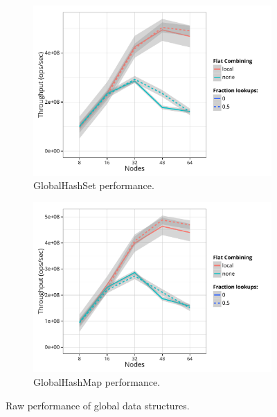 \begin{figure}[t]
  \begin{subfigure}[b]{0.45\textwidth}
  \centering
  \includegraphics[width=\textwidth]{data/plots/hashset_perf.pdf}
  \caption{GlobalHashSet performance.}
  \label{fig:hashset}
  \end{subfigure}
  \hspace{0.05\textwidth}
  \begin{subfigure}[b]{0.45\textwidth}
  \centering
  \includegraphics[width=\textwidth]{data/plots/hashmap_perf.pdf}
  \caption{GlobalHashMap performance.}
  \label{fig:hashmap}
  \end{subfigure}%
  \caption{Raw performance of global data structures.
  }\label{fig:datastructs}
\end{figure}

